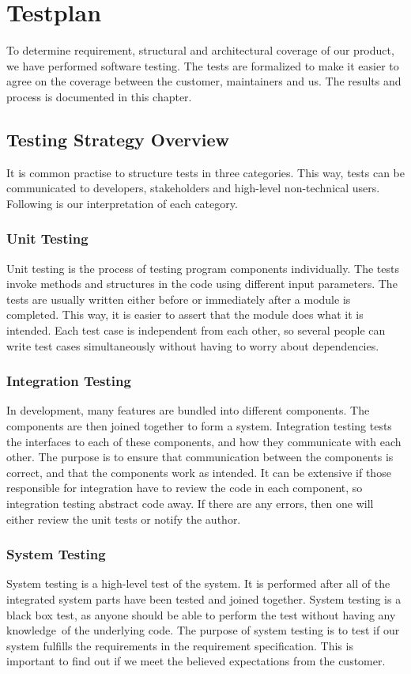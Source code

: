 \section{Testplan}
To determine requirement, structural and architectural coverage of our
product, we have performed software testing. The tests are formalized
to make it easier to agree on the coverage between the customer,
maintainers and us. The results and process is documented in this
chapter.

\subsection{Testing Strategy Overview}
It is common practise to structure tests in three categories. This way,
tests can be communicated to developers, stakeholders and high-level
non-technical users. 
Following is our interpretation of each category.
\subsubsection{Unit Testing}
Unit testing is the process of testing program components individually.
The tests invoke methods and structures in the code using different
input parameters. The tests are usually written either before or
immediately after a module is completed. This way, it is easier to
assert that the module does what it is intended. Each test case is
independent from each other, so several people can write test cases
simultaneously without having to worry about dependencies.

\subsubsection{Integration Testing}
In development, many features are bundled into different components. The
components are then joined together to form a system. Integration
testing tests the interfaces to each of these components, and how they
communicate with each other. The purpose is to ensure that
communication between the components is correct, and that the
components work as intended. It can be extensive if those responsible
for integration have to review the code in each component, so
integration testing abstract code away. If there are any errors, then
one will either review the unit tests or notify the author.

\subsubsection{System Testing}
System testing is a high-level test of the system. It is performed after
all of the integrated system parts have been tested and joined
together. System testing is a black box test, as anyone should be able
to perform the test without having any knowledge\ of the underlying
code. The purpose of system testing is to test if our system fulfills
the requirements in the requirement specification. This is important to
find out if we meet the believed expectations from the customer. 


